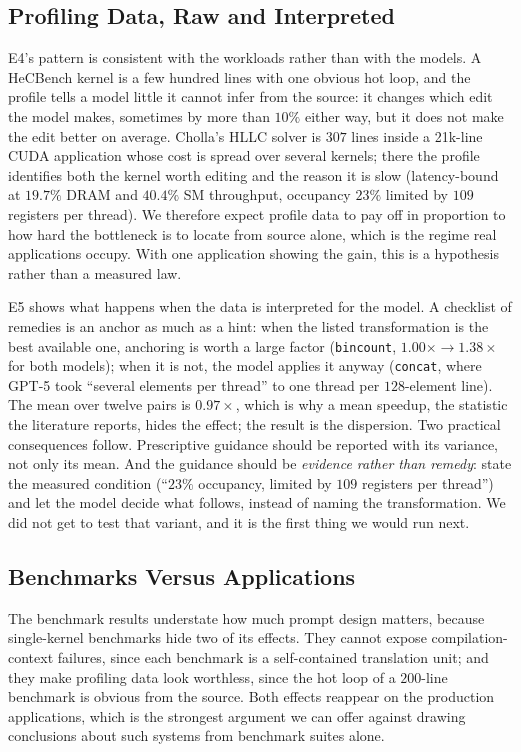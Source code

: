 \subsection{Profiling Data, Raw and Interpreted}
\label{sec:profdisc}
E4's pattern is consistent with the workloads rather than with the models. A HeCBench kernel is a few
hundred lines with one obvious hot loop, and the profile tells a model little it cannot infer from the
source: it changes which edit the model makes, sometimes by more than $10\%$ either way, but it does not
make the edit better on average. Cholla's HLLC solver is $307$ lines inside a 21k-line CUDA application
whose cost is spread over several kernels; there the profile identifies both the kernel worth editing
and the reason it is slow (latency-bound at $19.7\%$ DRAM and $40.4\%$ SM throughput, occupancy $23\%$
limited by $109$ registers per thread). We therefore expect profile data to pay off in proportion to
how hard the bottleneck is to locate from source alone, which is the regime real applications occupy.
With one application showing the gain, this is a hypothesis rather than a measured law.

E5 shows what happens when the data is interpreted for the model. A checklist of remedies is an anchor
as much as a hint: when the listed transformation is the best available one, anchoring is worth a large
factor (\texttt{bincount}, $1.00\times \to 1.38\times$ for both models); when it is not, the model
applies it anyway (\texttt{concat}, where GPT-5 took ``several elements per thread'' to one thread per
$128$-element line). The mean over twelve pairs is $0.97\times$, which is why a mean speedup, the
statistic the literature reports, hides the effect; the result is the dispersion. Two practical
consequences follow. Prescriptive guidance should be reported with its variance, not only its mean.
And the guidance should be \emph{evidence rather than remedy}: state the measured condition (``$23\%$
occupancy, limited by $109$ registers per thread'') and let the model decide what follows, instead of
naming the transformation. We did not get to test that variant, and it is the first thing we would run
next.

\subsection{Benchmarks Versus Applications}
\label{sec:bva}
The benchmark results understate how much prompt design matters, because single-kernel benchmarks hide
two of its effects. They cannot expose compilation-context failures, since each benchmark is a
self-contained translation unit; and they make profiling data look worthless, since the hot loop of a
$200$-line benchmark is obvious from the source. Both effects reappear on the production applications,
which is the strongest argument we can offer against drawing conclusions about such systems from
benchmark suites alone.

